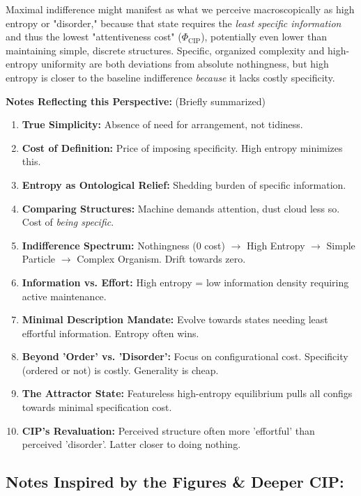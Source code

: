 \documentclass[11pt, a4paper]{article}
\newcommand{\subt}[1]{\mathrm{#1}}
\begin{document}
{{{Maximal indifference might manifest as what we perceive macroscopically as high entropy or "disorder," because that state requires the \textit{least specific information} and thus the lowest "attentiveness cost" ($\Phi_{\subt{CIP}}$), potentially even lower than maintaining simple, discrete structures. Specific, organized complexity and high-entropy uniformity are both deviations from absolute nothingness, but high entropy is closer to the baseline indifference \textit{because} it lacks costly specificity.

\textbf{Notes Reflecting this Perspective:} (Briefly summarized)
\begin{enumerate} \itemsep0em
    \item \textbf{True Simplicity:} Absence of need for arrangement, not tidiness.
    \item \textbf{Cost of Definition:} Price of imposing specificity. High entropy minimizes this.
    \item \textbf{Entropy as Ontological Relief:} Shedding burden of specific information.
    \item \textbf{Comparing Structures:} Machine demands attention, dust cloud less so. Cost of \textit{being specific}.
    \item \textbf{Indifference Spectrum:} Nothingness (0 cost) $\to$ High Entropy $\to$ Simple Particle $\to$ Complex Organism. Drift towards zero.
    \item \textbf{Information vs. Effort:} High entropy = low information density requiring active maintenance.
    \item \textbf{Minimal Description Mandate:} Evolve towards states needing least effortful information. Entropy often wins.
    \item \textbf{Beyond 'Order' vs. 'Disorder':} Focus on configurational cost. Specificity (ordered or not) is costly. Generality is cheap.
    \item \textbf{The Attractor State:} Featureless high-entropy equilibrium pulls all configs towards minimal specification cost.
    \item \textbf{CIP's Revaluation:} Perceived structure often more 'effortful' than perceived 'disorder'. Latter closer to doing nothing.
\end{enumerate}

\subsection{Notes Inspired by the Figures \& Deeper CIP:}

}}}
\end{document}
